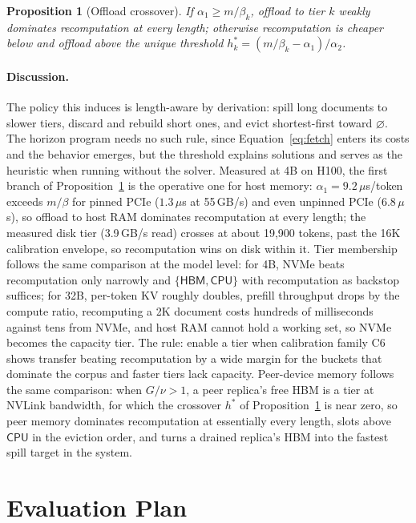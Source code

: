 \documentclass[10pt,twocolumn]{article}
\newtheorem{proposition}{Proposition}
\newcommand{\hbm}{\mathsf{HBM}}
\newcommand{\cpu}{\mathsf{CPU}}
\newcommand{\none}{\varnothing}
\begin{document}
\begin{proposition}[Offload crossover]
\label{prop:crossover}
If $\alpha_1 \ge m/\beta_k$, offload to tier $k$ weakly dominates recomputation at every length; otherwise recomputation is cheaper below and offload above the unique threshold $h^{\ast}_k = (m/\beta_k - \alpha_1)/\alpha_2$.
\end{proposition}

\paragraph{Discussion.} The policy this induces is length-aware by derivation: spill long documents to slower tiers, discard and rebuild short ones, and evict shortest-first toward $\none$. The horizon program needs no such rule, since Equation~\eqref{eq:fetch} enters its costs and the behavior emerges, but the threshold explains solutions and serves as the heuristic when running without the solver. Measured at 4B on H100, the first branch of Proposition~\ref{prop:crossover} is the operative one for host memory: $\alpha_1 = 9.2\,\mu$s/token exceeds $m/\beta$ for pinned PCIe ($1.3\,\mu$s at 55\,GB/s) and even unpinned PCIe ($6.8\,\mu$s), so offload to host RAM dominates recomputation at every length; the measured disk tier (3.9\,GB/s read) crosses at about 19{,}900 tokens, past the 16K calibration envelope, so recomputation wins on disk within it. Tier membership follows the same comparison at the model level: for 4B, NVMe beats recomputation only narrowly and $\{\hbm, \cpu\}$ with recomputation as backstop suffices; for 32B, per-token KV roughly doubles, prefill throughput drops by the compute ratio, recomputing a 2K document costs hundreds of milliseconds against tens from NVMe, and host RAM cannot hold a working set, so NVMe becomes the capacity tier. The rule: enable a tier when calibration family C6 shows transfer beating recomputation by a wide margin for the buckets that dominate the corpus and faster tiers lack capacity. Peer-device memory follows the same comparison: when $G/\nu > 1$, a peer replica's free HBM is a tier at NVLink bandwidth, for which the crossover $h^{\ast}$ of Proposition~\ref{prop:crossover} is near zero, so peer memory dominates recomputation at essentially every length, slots above $\cpu$ in the eviction order, and turns a drained replica's HBM into the fastest spill target in the system.

\section{Evaluation Plan}
\label{sec:eval}
\end{document}
